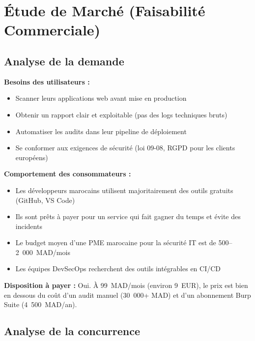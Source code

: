 \documentclass[12pt,a4paper]{report}
\begin{document}
\section{Étude de Marché (Faisabilité Commerciale)}

\subsection{Analyse de la demande}

\textbf{Besoins des utilisateurs :}
\begin{itemize}
  \item Scanner leurs applications web avant mise en production
  \item Obtenir un rapport clair et exploitable (pas des logs techniques bruts)
  \item Automatiser les audits dans leur pipeline de déploiement
  \item Se conformer aux exigences de sécurité (loi 09-08, RGPD pour les clients européens)
\end{itemize}

\textbf{Comportement des consommateurs :}
\begin{itemize}
  \item Les développeurs marocains utilisent majoritairement des outils gratuits (GitHub, VS Code)
  \item Ils sont prêts à payer pour un service qui fait gagner du temps et évite des incidents
  \item Le budget moyen d'une PME marocaine pour la sécurité IT est de 500--2~000~MAD/mois
  \item Les équipes DevSecOps recherchent des outils intégrables en CI/CD
\end{itemize}

\textbf{Disposition à payer :} Oui. À 99~MAD/mois (environ 9~EUR), le prix est bien en dessous du coût d'un audit manuel (30~000+ MAD) et d'un abonnement Burp Suite (4~500~MAD/an).

\subsection{Analyse de la concurrence}
\end{document}
